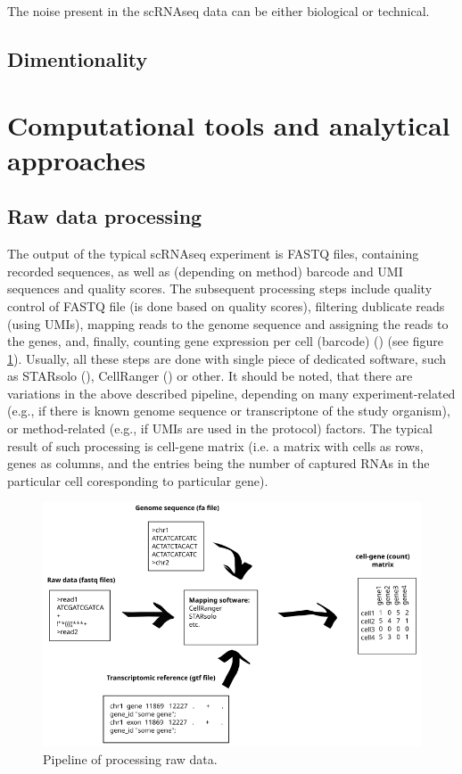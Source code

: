 The noise present in the scRNAseq data can be either biological or technical.

\subsection{Dimentionality}

\section{Computational tools and analytical approaches}

\subsection{Raw data processing}

The output of the typical scRNAseq experiment is FASTQ files, containing recorded sequences,
as well as (depending on method) barcode and UMI sequences and quality scores.
The subsequent processing steps include quality control of FASTQ file (is done based on quality scores),
filtering dublicate reads (using UMIs), mapping reads to the genome sequence and assigning the reads to the genes,
and, finally, counting gene expression per cell (barcode) (\cite{Heumos2023}) (see figure \ref{fig:rawData}).
Usually, all these steps are done with single piece of dedicated software,
such as STARsolo (\cite{Kaminow2021}), CellRanger (\cite{Zheng2017}) or other.
It should be noted, that there are variations in the above described pipeline,
depending on many experiment-related (e.g., if there is known genome sequence or transcriptone of the study organism),
or method-related (e.g., if UMIs are used in the protocol) factors.
The typical result of such processing is cell-gene matrix (i.e. a matrix with cells as rows, genes as columns,
and the entries being the number of captured RNAs in the particular cell coresponding to particular gene).

\begin{figure}
  \centering
  \includegraphics[width=\linewidth]{images/rawdata.png}
  \caption{Pipeline of processing raw data.}
  \label{fig:rawData}
\end{figure}

